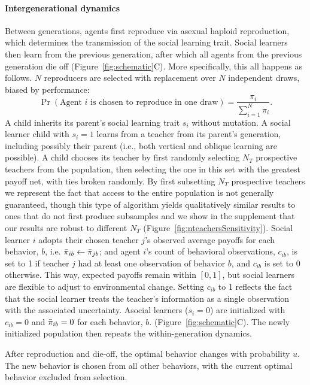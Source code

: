 \documentclass[letterpaper,11.5pt]{scrartcl}
\begin{document}
\paragraph{Intergenerational dynamics} Between generations, agents first reproduce
via asexual haploid reproduction, which determines the transmission of the social
learning trait. Social learners then learn from the previous generation, after which
all agents from the previous generation die off (Figure~\ref{fig:schematic}C). More
specifically, this all happens as follows.  $N$ reproducers are selected with
replacement over $N$ independent draws, biased by performance: 
\begin{equation}
  \Pr(\text{Agent $i$ is chosen to reproduce in one draw}) =
\frac{\pi_i}{\sum_{i=1}^N \pi_i}.  
\end{equation} 
\noindent 
A child inherits its
parent's social learning trait $s_i$ without mutation.  A social learner child with
$s_i = 1$ learns from a teacher from its parent's generation, including possibly
their parent (i.e., both vertical and oblique learning are possible).  A child
chooses its teacher by first randomly selecting $N_T$ prospective teachers from the
population, then selecting the one in this set with the greatest payoff net, with ties broken randomly. By first subsetting $N_T$
prospective teachers we represent the fact that access to the entire population is
not generally guaranteed, though this type of algorithm yields qualitatively
similar results to ones that do not first produce subsamples
\citep{smaldino2019open} and we show in the supplement 
that our results are robust to different $N_T$
(Figure~\ref{fig:nteachersSensitivity}).  Social learner $i$ adopts their chosen 
teacher $j$'s observed average payoffs for each behavior, $b$, i.e. 
$\bar\pi_{ib} \leftarrow \bar\pi_{jb}$; 
and agent $i$'s count of behavioral observations, $c_{ib}$, is set to 1 if teacher $j$ had at least one observation of behavior $b$,  
and $c_{ib}$ is set to 0 otherwise. This way, expected payoffs remain within $[0,
1]$, but social learners are flexible to adjust to environmental change. 
Setting $c_{ib}$ to 1 reflects the fact that the social learner
treats the teacher's information as a single observation with the associated
uncertainty. Asocial learners ($s_i = 0$) are initialized with $c_{ib} = 0$ and
$\bar\pi_{ib} = 0$ for each behavior, $b$.
(Figure~\ref{fig:schematic}C). The newly initialized population
then repeats the within-generation dynamics. 

After reproduction and die-off, the optimal behavior changes with probability
$u$. The new behavior is chosen from all other behaviors, with the 
current optimal behavior excluded from selection.
\end{document}
